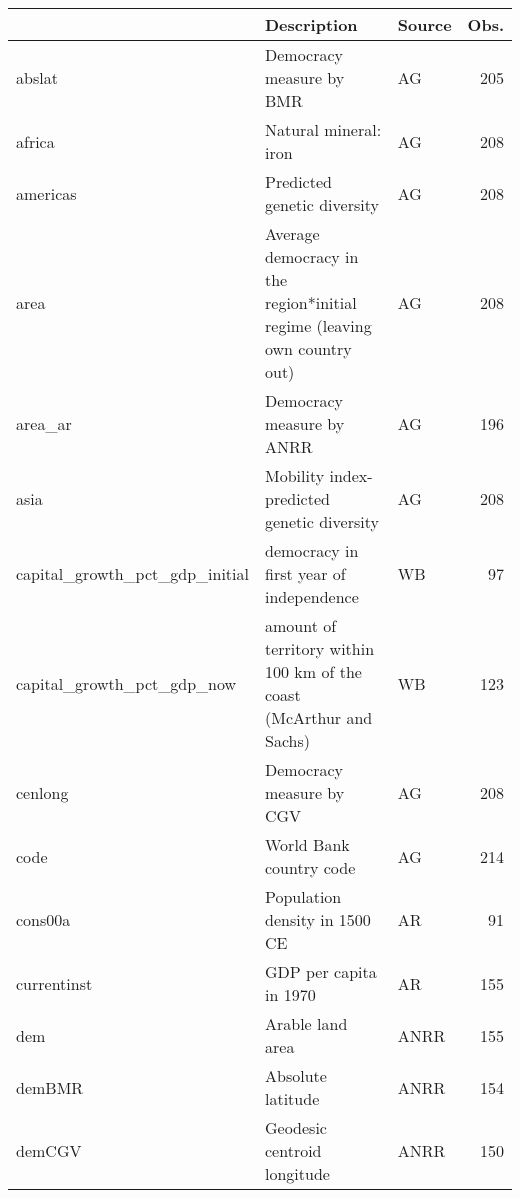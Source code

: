 \begin{tabular}{lllr}
\toprule
{} &                                                               Description & Source &  Obs. \\
\midrule
abslat                         &                                                  Democracy measure by BMR &     AG &   205 \\
africa                         &                                                     Natural mineral: iron &     AG &   208 \\
americas                       &                                               Predicted genetic diversity &     AG &   208 \\
area                           &  Average democracy in the region*initial regime (leaving own country out) &     AG &   208 \\
area\_ar                        &                                                 Democracy measure by ANRR &     AG &   196 \\
asia                           &                                Mobility index-predicted genetic diversity &     AG &   208 \\
capital\_growth\_pct\_gdp\_initial &                                   democracy in first year of independence &     WB &    97 \\
capital\_growth\_pct\_gdp\_now     &       amount of territory within 100 km of the coast (McArthur and Sachs) &     WB &   123 \\
cenlong                        &                                                  Democracy measure by CGV &     AG &   208 \\
code                           &                                                   World Bank country code &     AG &   214 \\
cons00a                        &                                             Population density in 1500 CE &     AR &    91 \\
currentinst                    &                                                    GDP per capita in 1970 &     AR &   155 \\
dem                            &                                                          Arable land area &   ANRR &   155 \\
demBMR                         &                                                         Absolute latitude &   ANRR &   154 \\
demCGV                         &                                               Geodesic centroid longitude &   ANRR &   150 \\

\end{tabular}
